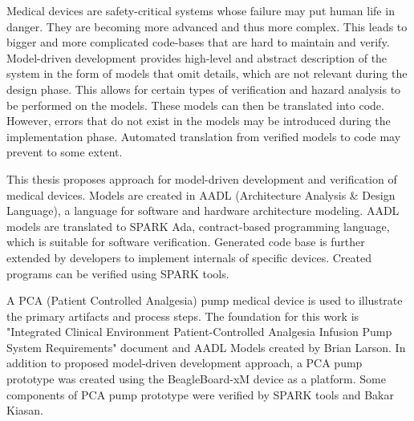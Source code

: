 
\pagestyle{empty}
\setlength{\baselineskip}{0.8cm}

\indent


Medical devices are safety-critical systems whose failure may put human life in danger. They are becoming more advanced and thus more complex. This leads to bigger and more complicated code-bases that are hard to maintain and verify. Model-driven development provides high-level and abstract description of the system in the form of models that omit details, which are not relevant during the design phase. This allows for certain types of verification and hazard analysis to be performed on the models. These models can then be translated into code. However, errors that do not exist in the models may be introduced during the implementation phase. Automated translation from verified models to code may prevent to some extent.

This thesis proposes approach for model-driven development and verification of medical devices. Models are created in AADL (Architecture Analysis \& Design Language), a language for software and hardware architecture modeling. AADL models are translated to SPARK Ada, contract-based programming language, which is suitable for software verification. Generated code base is further extended by developers to implement internals of specific devices. Created programs can be verified using SPARK tools.

A PCA (Patient Controlled Analgesia) pump medical device is used to illustrate the primary artifacts and process steps. The foundation for this work is "Integrated Clinical Environment Patient-Controlled Analgesia Infusion Pump System Requirements" document and AADL Models created by Brian Larson. In addition to proposed model-driven development approach, a PCA pump prototype was created using the BeagleBoard-xM device as a platform. Some components of PCA pump prototype were verified by SPARK tools and Bakar Kiasan.
